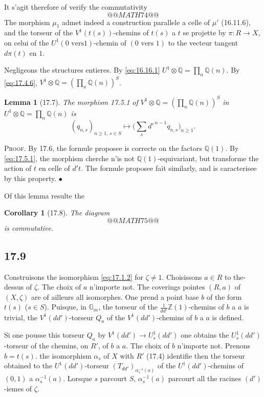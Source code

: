 \documentclass[12pt,a4paper]{article}
\theoremstyle{plain}
\newtheorem{lemma}[theorem]{Lemma}
\newtheorem{corollary}[theorem]{Corollary}
\theoremstyle{definition}
\theoremstyle{remark}
\newcommand{\Gm}{\mathbb{G}_m}
\newcommand{\ZZ}{\mathbb{Z}}
\newcommand{\QQ}{\mathbb{Q}}
\begin{document}
It s'agit therefore of verify the commutativity
\[
@@MATH74@@
\]
The morphism $\mu_1$ admet indeed a construction parallele a celle
of $\mu'$ (16.11.6), and the torseur of the $V^1(t(s))$-chemins of $t(s)$ a
$t$ se projette by $\pi : R \to X$, on celui of the $U^1(0 \text{ vers
} 1)$-chemin of $(0 \text{ vers } 1)$ to the vecteur tangent $d\pi(t)$ en
$1$.

Negligeons the structures entieres. By \eqref{eq:16.16.1}
$U^1 \otimes \QQ = \prod_n \QQ(n)$. By \eqref{eq:17.4.6},
$V^1 \otimes \QQ = (\prod_n \QQ(n))^S$.

\begin{lemma}[17.7]\label{lem:17.7}
The morphism 17.5.1 of
$V^1 \otimes \QQ = (\prod_n \QQ(n))^S$ in
$U^1 \otimes \QQ = \prod_n \QQ(n)$ is
\[
(q_{n,s})_{n \geq 1,\, s \in S} \longmapsto
\bigl(\sum_s d'^{\,n-1} q_{n,s}\bigr)_{n \geq 1}.
\]
\end{lemma}

\noindent \textsc{Proof.} By 17.6, the formule proposee is correcte
on the factors $\QQ(1)$. By \eqref{eq:17.5.1}, the morphism cherche
n'is not $\QQ(1)$-equivariant, but transforme the action of $t$ en
celle of $d't$. The formule proposee fait similarly, and is caracterisee
by this property. \hfill $\bullet$

Of this lemma resulte the

\begin{corollary}[17.8]\label{cor:17.8}
The diagram
\[
@@MATH75@@
\]
is commutative.
\end{corollary}

\subsection{17.9}

Construisons the isomorphism \eqref{eq:17.1.2} for $\zeta \neq 1$.
Choisissons $a \in R$ to the-dessus of $\zeta$. The choix of $a$ n'importe
not. The coverings pointes $(R,a)$ of $(X,\zeta)$ are of ailleurs
all isomorphes. One prend a point base $b$ of the form $t(s)$
($s \in S$). Puisque, in $\Gm$, the torseur of the
$\frac{1}{dd'}\ZZ(1)$-chemins of $b$ a $a$ is trivial, the
$V^1(dd')$-torseur $Q_a$ of the $V^1(dd')$-chemins of $b$ a $a$ is
defined.

Si one pousse this torseur $Q_a$ by $V^1(dd') \to U_s^1(dd')$ one obtains the $U_s^1(dd')$-torseur of the chemins, on $R'$, of $b$ a $a$.
The choix of $b$ n'importe not. Prenons $b = t(s)$. the isomorphism
$\alpha_s$ of $X$ with $R'$ (17.4) identifie then the torseur obtained
to the $U^1(dd')$-torseur $(T_{dd'})_{\alpha_s^{-1}(a)}$ of the
$U^1(dd')$-chemins of $(0,1)$ a $\alpha_s^{-1}(a)$. Lorsque $s$
parcourt $S$, $\alpha_s^{-1}(a)$ parcourt all the racines
$(d')$-iemes of $\zeta$.
\end{document}

